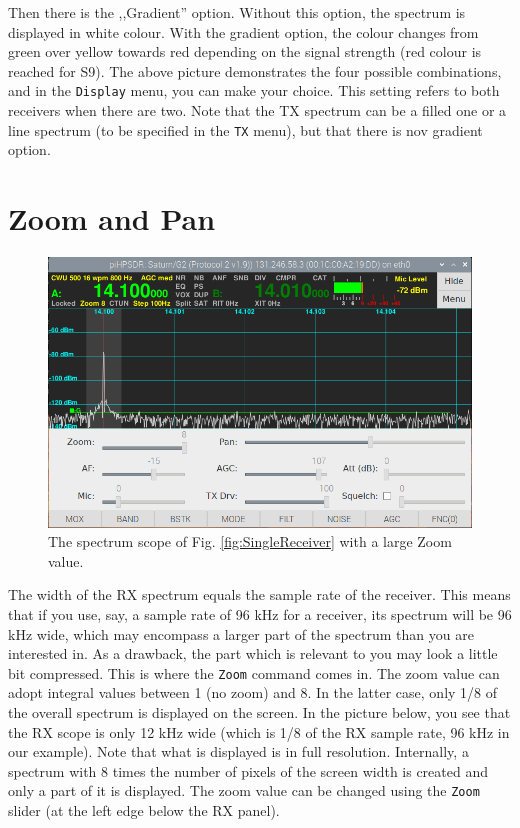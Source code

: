 \documentclass[12pt]{book}
\def\rett#1{\texttt{\color{red}#1}}
\def\bltt#1{\texttt{\color{blue}#1}}
\begin{document}
Then there is the ,,Gradient'' option. Without this option, the
spectrum is displayed in white colour. With the gradient option,
the colour changes from green over yellow towards red depending
on the signal strength (red colour is reached for S9). The above
picture demonstrates the four possible combinations, and in
the \bltt{Display} menu, you can make your choice. This setting
refers to both receivers when there are two. Note that the TX
spectrum can be a filled one or a line spectrum (to be specified
in the \bltt{TX} menu), but that there
is nov gradient option.

\section{Zoom and Pan}

\begin{figure}[ht]
\center
\includegraphics[width=12cm]{ZoomPan.png}
\caption{The spectrum scope of Fig. \ref{fig:SingleReceiver} with a
large Zoom value.}
\end{figure}

The width of the RX spectrum equals the sample rate
of the receiver. This means that if you use, say,
a sample rate of 96 kHz for a receiver, its spectrum
will be 96 kHz wide, which may encompass a larger part
of the spectrum than you are interested in. As a drawback,
the part which is relevant to you may look a little bit
compressed. This is where the \bltt{Zoom} command
comes in. The zoom value can adopt integral values between
1 (no zoom) and 8. In the latter case, only 1/8 of the
overall spectrum is displayed on the screen. In the
picture below, you see that the RX scope is only 12 kHz
wide (which is 1/8 of the RX sample rate, 96 kHz in our
example). Note that what is displayed is in full resolution.
Internally, a spectrum with 8 times the number of pixels
of the screen width is created and only a part of it is
displayed. The zoom value can be changed using the \rett{Zoom}
slider (at the left edge below the RX panel).
\end{document}
